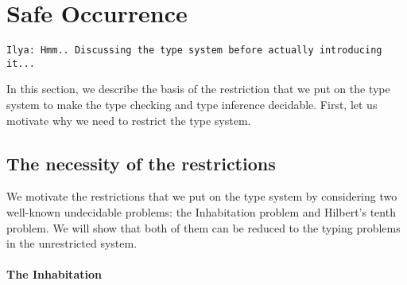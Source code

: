 \documentclass[a4,natbib=false]{article}
\newcommand{\ilyam}[1]{{\color{red} \texttt{Ilya:  #1}}}
\newcommand{\bnfalt}{\;\;|\;\;}
\newcommand{\letname}{\mathsf{let}}
\newcommand{\dletname}{\mathsf{dlet}}
\newcommand{\letval}[3]{\letname\; {#1} \,:=\, {#2} \;\mathsf{in}\; {#3}}
\newcommand{\dletval}[3]{\dletname\; {#1} \,:=\, {#2} \;\mathsf{in}\; {#3}}
\newcommand{\pair}[2]{\left\langle{#1}, {#2}\right\rangle}
\newcommand{\comptoval}[1]{\downarrow \hspace{-2pt} #1}
\newcommand{\valtocomp}[1]{\uparrow \hspace{-2pt} #1}
\newcommand{\sigmatype}[2]{\Sigma {#1}.\,#2}
\newcommand{\pitype}[2]{\Pi {#1}.\,#2}
\newcommand{\foralltype}[2]{\forall {#1}.\,#2}
\newcommand{\eqtype}[3]{\mathsf{eq}{#1}\,{#2}\,{#3}}
\newcommand{\refl}{\mathsf{refl}}
\newcommand{\force}[1]{\mathsf{force}\,{#1}}
\newcommand{\thunk}[1]{\{{#1}\}}
\newcommand{\recsigmaname}{\mathsf{rec}_{\Sigma}}
\newcommand{\recsigma}[3]{\recsigmaname^{#2}({#1},{#3})}
\newcommand{\receqname}{\mathsf{rec}_{\mathsf{eq}}}
\newcommand{\receq}[3]{\receqname^{#2}({#1},{#3})}
\begin{document}





\section{Safe Occurrence}

\ilyam{Hmm.. Discussing the type system before actually introducing it...}

In this section, we describe the basis of the restriction that we put on the type system to
make the type checking and type inference decidable. First, let us motivate why we need to
restrict the type system.

\subsection{The necessity of the restrictions}

We motivate the restrictions that we put on the type system by considering two
well-known undecidable problems: the Inhabitation problem and Hilbert's tenth
problem. We will show that both of them can be reduced to the typing problems in
the unrestricted system.

\paragraph{The Inhabitation}
\end{document}
